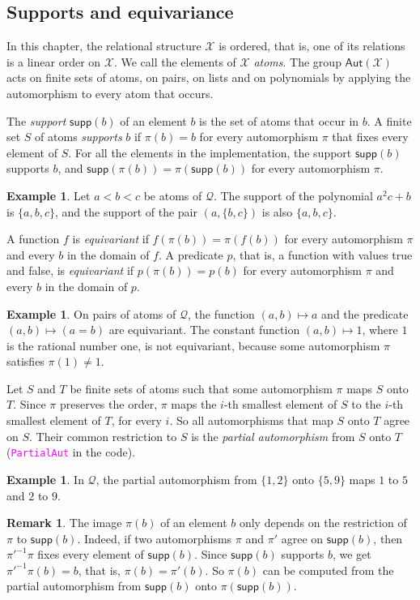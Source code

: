 \documentclass[12pt,a4paper,article]{memoir}
\newcommand{\struct}{\mathcal{X}}
\newcommand{\dloQ}{\mathcal{Q}}
\newcommand{\aut}[1]{\mathsf{Aut}\left(#1\right)}
\newcommand{\emphdef}[1]{\emph{\textcolor{BrickRed}{#1}}}
\newcommand{\code}[1]{\texttt{\textcolor{magenta}{#1}}}
\theoremstyle{definition}
\newtheorem{example}[theorem]{Example}
\newtheorem{remark}[theorem]{Remark}
\begin{document}
\subsection{Supports and equivariance}
%
In this chapter, the relational structure $\struct$ is ordered,
that is, one of its relations is a linear order on $\struct$.
We call the elements of $\struct$ \emphdef{atoms}.
The group $\aut{\struct}$ acts on finite sets of atoms, on pairs, on lists and on polynomials
by applying the automorphism to every atom that occurs.

The \emphdef{support} $\mathsf{supp}(b)$ of an element $b$ is the set of atoms that occur in $b$.
A finite set $S$ of atoms \emphdef{supports} $b$ if $\pi(b) = b$ for every automorphism $\pi$ that fixes every element of $S$.
For all the elements in the implementation,
the support $\mathsf{supp}(b)$ supports $b$,
and $\mathsf{supp}(\pi(b)) = \pi(\mathsf{supp}(b))$ for every automorphism $\pi$.
%
\begin{example}
Let $a < b < c$ be atoms of $\dloQ$.
The support of the polynomial $a^2c + b$ is $\{a,b,c\}$,
and the support of the pair $(a,\{b,c\})$ is also $\{a,b,c\}$.
\end{example}
%
A function $f$ is \emphdef{equivariant} if $f(\pi(b)) = \pi(f(b))$ for every automorphism $\pi$ and every $b$ in the domain of $f$.
A predicate $p$, that is, a function with values true and false, is \emphdef{equivariant} if $p(\pi(b)) = p(b)$ for every automorphism $\pi$ and every $b$ in the domain of $p$.
%
\begin{example}
On pairs of atoms of $\dloQ$,
the function $(a,b)\mapsto a$ and the predicate $(a,b)\mapsto (a = b)$ are equivariant.
The constant function $(a,b)\mapsto 1$, where $1$ is the rational number one, is not equivariant,
because some automorphism $\pi$ satisfies $\pi(1) \neq 1$.
\end{example}
%
Let $S$ and $T$ be finite sets of atoms such that some automorphism $\pi$ maps $S$ onto $T$.
Since $\pi$ preserves the order,
$\pi$ maps the $i$-th smallest element of $S$ to the $i$-th smallest element of $T$, for every $i$.
So all automorphisms that map $S$ onto $T$ agree on $S$.
Their common restriction to $S$ is the \emphdef{partial automorphism} from $S$ onto $T$
(\code{PartialAut} in the code).
%
\begin{example}
In $\dloQ$, the partial automorphism from $\{1,2\}$ onto $\{5,9\}$ maps $1$ to $5$ and $2$ to $9$.
\end{example}
%
\begin{remark}\label{rem:paut}
The image $\pi(b)$ of an element $b$ only depends on the restriction of $\pi$ to $\mathsf{supp}(b)$.
Indeed, if two automorphisms $\pi$ and $\pi'$ agree on $\mathsf{supp}(b)$,
then $\pi'^{-1}\pi$ fixes every element of $\mathsf{supp}(b)$.
Since $\mathsf{supp}(b)$ supports $b$, we get $\pi'^{-1}\pi(b) = b$, that is, $\pi(b) = \pi'(b)$.
So $\pi(b)$ can be computed from the partial automorphism from $\mathsf{supp}(b)$ onto $\pi(\mathsf{supp}(b))$.
\end{remark}
%
\end{document}
